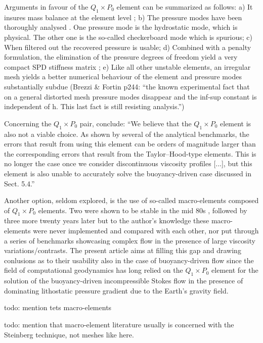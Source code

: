 \documentclass[a4paper,12pt]{article}
\begin{document}
Arguments in favour of the $Q_1\times P_0$ element can be summarized as follows:
a) It insures mass balance at the element level \cite[p459]{grsa};
b) The pressure modes have been thoroughly analysed \cite{sagl81a,sagl81b,grsi94}.
One pressure mode is the hydrostatic mode, which is  
physical. The other one is the so-called checkerboard mode which is spurious;
c) When filtered out \cite{chpc95} the recovered pressure is usable;
d) Combined with a penalty formulation, the elimination of the pressure degrees of freedom 
yield a very compact SPD stiffness matrix \cite{zigo75,hulb79,zina82,redd82,odks82};
e) Like all other unstable elements, an irregular mesh yields a 
better numerical behaviour of the element \cite{qizh07} and pressure modes substantially subdue
(Brezzi \& Fortin p244: ``the known experimental fact that on a general
distorted mesh pressure modes disappear and the inf-sup constant is independent of h. 
This last fact is still resisting analysis.'')

Concerning the $Q_1 \times P_0$ pair, \cite{thba22} conclude:
``We believe that the $Q_1 \times P_0$ element is also not a viable
choice. As shown by several of the analytical benchmarks, the errors that result from using this element can
be orders of magnitude larger than the corresponding
errors that result from the Taylor–Hood-type elements.
This is no longer the case once we consider discontinuous viscosity profiles [...], but this element
is also unable to accurately solve the buoyancy-driven
case discussed in Sect. 5.4.''

Another option, seldom explored, is the use of so-called macro-elements composed of $Q_1\times P_0$ elements. 
Two were shown to be stable in the mid 80s \cite{leta81,sten84}, followed by three more twenty years
later\cite{qizh07} but to the author's knowledge these macro-elements were never 
implemented and compared with each other, nor put through a series of benchmarks showcasing complex flow in the 
presence of large viscosity variations/contrasts. The present article aims at 
filling this gap and drawing conlusions as to their usability also in the case of buoyancy-driven flow
since the field of computational geodynamics has long relied on the $Q_1\times P_0$ element for the 
solution of the buoyancy-driven incompressible Stokes flow in the presence of 
dominating lithostatic pressure gradient due to the Earth's gravity field.  

{\color{red} todo: mention tets macro-elements}

{\color{red} todo: mention that macro-element literature usually is concerned with 
the Steinberg technique, not meshes like here.}
\end{document}
